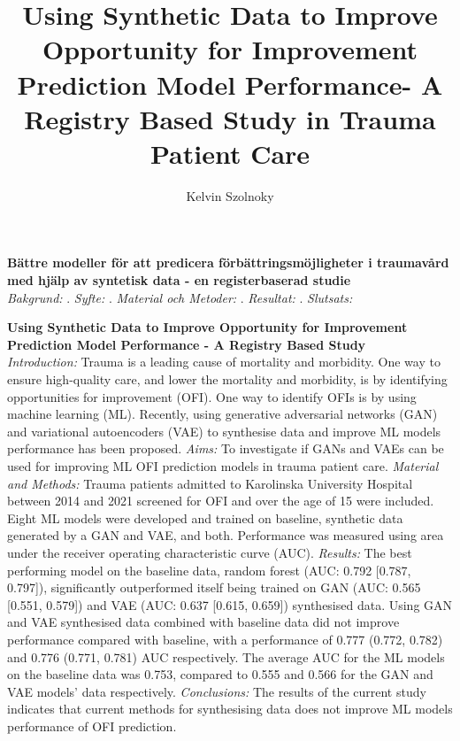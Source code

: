 \documentclass[12pt, a4paper]{article}
\author{Kelvin Szolnoky}
\title{Using Synthetic Data to Improve Opportunity for Improvement Prediction Model Performance- A Registry Based Study in Trauma Patient Care}
\begin{document}

\begin{titlepage}
	
\end{titlepage}
\fontsize{11}{13}\selectfont


\textbf{Bättre modeller för att predicera förbättringsmöjligheter i traumavård med hjälp av syntetisk data - en registerbaserad studie} \\
\textit{Bakgrund:} . \textit{Syfte:} . \textit{Material och Metoder:} . \textit{Resultat:} . \textit{Slutsats:}
\vfill

\textbf{Using Synthetic Data to Improve Opportunity for Improvement Prediction Model Performance - A Registry Based Study } \\
\textit{Introduction:} Trauma is a leading cause of mortality and morbidity. One way to ensure high-quality care, and lower the mortality and morbidity, is by identifying opportunities for improvement (OFI). One way to identify OFIs is by using machine learning (ML). Recently, using generative adversarial networks (GAN) and variational autoencoders (VAE) to synthesise data and improve ML models performance has been proposed. \textit{Aims:} To investigate if GANs and VAEs can be used for improving ML OFI prediction models in trauma patient care. \textit{Material and Methods:} Trauma patients admitted to Karolinska University Hospital between 2014 and 2021 screened for OFI and over the age of 15 were included. Eight ML models were developed and trained on baseline, synthetic data generated by a GAN and VAE, and both. Performance was measured using area under the receiver operating characteristic curve (AUC). \textit{Results:} The best performing model on the baseline data, random forest (AUC: 0.792 [0.787, 0.797]), significantly outperformed itself being trained on GAN (AUC: 0.565 [0.551, 0.579]) and VAE (AUC: 0.637 [0.615, 0.659]) synthesised data. Using GAN and VAE synthesised data combined with baseline data did not improve performance compared with baseline, with a performance of 0.777 (0.772, 0.782) and 0.776 (0.771, 0.781) AUC respectively. The average AUC for the ML models on the baseline data was 0.753, compared to 0.555 and 0.566 for the GAN and VAE models' data respectively. \textit{Conclusions:} The results of the current study indicates that current methods for synthesising data does not improve ML models performance of OFI prediction.
\vfill
\end{document}
